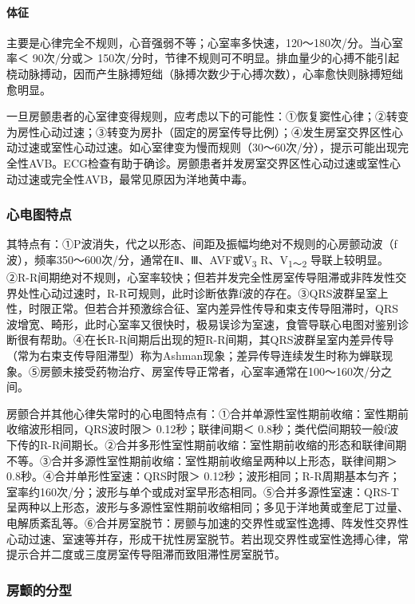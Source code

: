 \paragraph{体征}

主要是心律完全不规则，心音强弱不等；心室率多快速，120～180次/分。当心室率＜
90次/分或＞
150次/分时，节律不规则可不明显。排血量少的心搏不能引起桡动脉搏动，因而产生脉搏短绌（脉搏次数少于心搏次数），心率愈快则脉搏短绌愈明显。

一旦房颤患者的心室律变得规则，应考虑以下的可能性：①恢复窦性心律；②转变为房性心动过速；③转变为房扑（固定的房室传导比例）；④发生房室交界区性心动过速或室性心动过速。如心室律变为慢而规则（30～60次/分），提示可能出现完全性AVB。ECG检查有助于确诊。房颤患者并发房室交界区性心动过速或室性心动过速或完全性AVB，最常见原因为洋地黄中毒。

\subsubsection{心电图特点}

其特点有：①P波消失，代之以形态、间距及振幅均绝对不规则的心房颤动波（f波），频率350～600次/分，通常在Ⅱ、Ⅲ、AVF或V\textsubscript{3}
R、V\textsubscript{1～2}
导联上较明显。②R-R间期绝对不规则，心室率较快；但若并发完全性房室传导阻滞或非阵发性交界处性心动过速时，R-R可规则，此时诊断依靠f波的存在。③QRS波群呈室上性，时限正常。但若合并预激综合征、室内差异性传导和束支传导阻滞时，QRS波增宽、畸形，此时心室率又很快时，极易误诊为室速，食管导联心电图对鉴别诊断很有帮助。④在长R-R间期后出现的短R-R间期，其QRS波群呈室内差异传导（常为右束支传导阻滞型）称为Ashman现象；差异传导连续发生时称为蝉联现象。⑤房颤未接受药物治疗、房室传导正常者，心室率通常在100～160次/分之间。

房颤合并其他心律失常时的心电图特点有：①合并单源性室性期前收缩：室性期前收缩波形相同，QRS波时限＞
0.12秒；联律间期＜
0.8秒；类代偿间期较一般f波下传的R-R间期长。②合并多形性室性期前收缩：室性期前收缩的形态和联律间期不等。③合并多源性室性期前收缩：室性期前收缩呈两种以上形态，联律间期＞
0.8秒。④合并单形性室速：QRS时限＞
0.12秒；波形相同；R-R周期基本匀齐；室率约160次/分；波形与单个或成对室早形态相同。⑤合并多源性室速：QRS-T呈两种以上形态，波形与多源性室性期前收缩相同；多见于洋地黄或奎尼丁过量、电解质紊乱等。⑥合并房室脱节：房颤与加速的交界性或室性逸搏、阵发性交界性心动过速、室速等并存，形成干扰性房室脱节。若出现交界性或室性逸搏心律，常提示合并二度或三度房室传导阻滞而致阻滞性房室脱节。

\subsubsection{房颤的分型}


